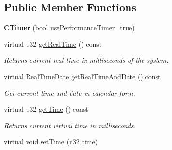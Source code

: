 \subsection*{Public Member Functions}
\begin{DoxyCompactItemize}
\item 
\hypertarget{classirr_1_1_c_timer_a2a059923625194e2777188bcec435089}{{\bfseries C\-Timer} (bool use\-Performance\-Timer=true)}\label{classirr_1_1_c_timer_a2a059923625194e2777188bcec435089}

\item 
virtual u32 \hyperlink{classirr_1_1_c_timer_aa1baf582e2c6f5fec45f5939cd47ef46}{get\-Real\-Time} () const 
\begin{DoxyCompactList}\small\item\em Returns current real time in milliseconds of the system. \end{DoxyCompactList}\item 
\hypertarget{classirr_1_1_c_timer_abcc36450a9ec9f9bd219fbe536d7c0c0}{virtual Real\-Time\-Date \hyperlink{classirr_1_1_c_timer_abcc36450a9ec9f9bd219fbe536d7c0c0}{get\-Real\-Time\-And\-Date} () const }\label{classirr_1_1_c_timer_abcc36450a9ec9f9bd219fbe536d7c0c0}

\begin{DoxyCompactList}\small\item\em Get current time and date in calendar form. \end{DoxyCompactList}\item 
virtual u32 \hyperlink{classirr_1_1_c_timer_ab8fc2a90ee160e65c2cdbef10414af8a}{get\-Time} () const 
\begin{DoxyCompactList}\small\item\em Returns current virtual time in milliseconds. \end{DoxyCompactList}\item 
\hypertarget{classirr_1_1_c_timer_a399a94713673709ede8825bcfc36fe52}{virtual void \hyperlink{classirr_1_1_c_timer_a399a94713673709ede8825bcfc36fe52}{set\-Time} (u32 time)}\label{classirr_1_1_c_timer_a399a94713673709ede8825bcfc36fe52}


\end{DoxyCompactItemize}
